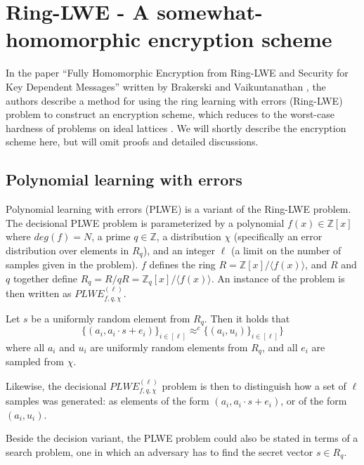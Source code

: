\documentclass[../main.tex]{subfiles}
\begin{document}
\section{Ring-LWE - A somewhat-homomorphic encryption scheme} \label{sec:RLWE-theory}

In the paper ``Fully Homomorphic Encryption from Ring-LWE and Security for Key Dependent Messages'' written by
Brakerski and Vaikuntanathan \cite{brakerski2011fully},
the authors describe a method for using the ring learning with errors (Ring-LWE) problem to construct an encryption scheme,
which reduces to the worst-case hardness of problems on ideal lattices \cite{brakerski2011fully}.
We will shortly describe the encryption scheme here, but will omit proofs and detailed discussions.

\subsection{Polynomial learning with errors}

Polynomial learning with errors (PLWE) is a variant of the Ring-LWE problem.
The decisional PLWE problem is parameterized by a polynomial $f(x) \in \mathbb{Z}[x]$ where $deg(f) = N$, a prime $q \in \mathbb{Z}$, a distribution $\chi$ (specifically an error distribution over elements in $R_q$), and an integer $\ell$ (a limit on the number of samples given in the problem).
$f$ defines the ring $R = \mathbb{Z}[x] / \langle f(x) \rangle$, and $R$ and $q$ together define $R_q = R / q R = \mathbb{Z}_q[x] / \langle f(x) \rangle$.
An instance of the problem is then written as $PLWE_{f, q, \chi}^{(\ell)}$.

\begin{definition}
    Let $s$ be a uniformly random element from $R_q$.
    Then it holds that 
    \[
        \{ (a_i, a_i \cdot s + e_i) \}_{i \in [\ell]} \approx^{c} \{(a_i, u_i) \}_{i \in [\ell]}\}
    \]
    where all $a_i$ and $u_i$ are uniformly random elements from $R_q$, and all $e_i$ are sampled from $\chi$.
\end{definition}

Likewise, the decisional $PLWE_{f, q, \chi}^{(\ell)}$ problem is then to distinguish how a set of $\ell$ samples was generated: as elements of the form $(a_i, a_i \cdot s + e_i)$, or of the form $(a_i, u_i)$.

Beside the decision variant, the PLWE problem could also be stated in terms of a search problem, one in which
an adversary has to find the secret vector $s \in R_q$.
\end{document}
